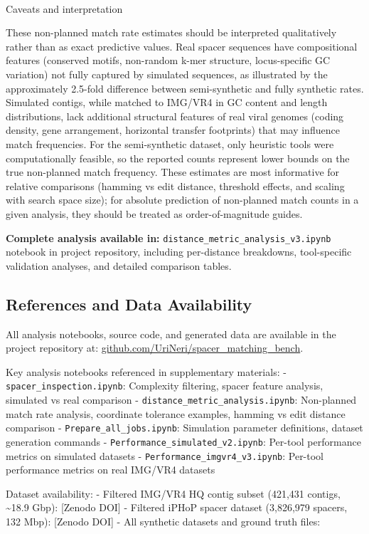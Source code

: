 \documentclass[
]{article}
\makeatletter
\let\oldparagraph\paragraph
\renewcommand{\paragraph}{
    \@ifstar
      \xxxParagraphStar
      \xxxParagraphNoStar
  }
\newcommand{\xxxParagraphStar}[1]{\oldparagraph*{#1}\mbox{}}
\newcommand{\xxxParagraphNoStar}[1]{\oldparagraph{#1}\mbox{}}
\makeatother
\begin{document}
\paragraph{Caveats and interpretation}\label{caveats-and-interpretation}

These non-planned match rate estimates should be interpreted
qualitatively rather than as exact predictive values. Real spacer
sequences have compositional features (conserved motifs, non-random
k-mer structure, locus-specific GC variation) not fully captured by
simulated sequences, as illustrated by the approximately 2.5-fold
difference between semi-synthetic and fully synthetic rates. Simulated
contigs, while matched to IMG/VR4 in GC content and length
distributions, lack additional structural features of real viral genomes
(coding density, gene arrangement, horizontal transfer footprints) that
may influence match frequencies. For the semi-synthetic dataset, only
heuristic tools were computationally feasible, so the reported counts
represent lower bounds on the true non-planned match frequency. These
estimates are most informative for relative comparisons (hamming vs edit
distance, threshold effects, and scaling with search space size); for
absolute prediction of non-planned match counts in a given analysis,
they should be treated as order-of-magnitude guides.

\textbf{Complete analysis available in:}
\texttt{distance\_metric\_analysis\_v3.ipynb} notebook in project
repository, including per-distance breakdowns, tool-specific validation
analyses, and detailed comparison tables.

\subsection{References and Data
Availability}\label{references-and-data-availability}

All analysis notebooks, source code, and generated data are available in
the project repository at:
\href{https://github.com/UriNeri/spacer_matching_bench}{github.com/UriNeri/spacer\_matching\_bench}.

Key analysis notebooks referenced in supplementary materials: -
\texttt{spacer\_inspection.ipynb}: Complexity filtering, spacer feature
analysis, simulated vs real comparison -
\texttt{distance\_metric\_analysis.ipynb}: Non-planned match rate
analysis, coordinate tolerance examples, hamming vs edit distance
comparison - \texttt{Prepare\_all\_jobs.ipynb}: Simulation parameter
definitions, dataset generation commands -
\texttt{Performance\_simulated\_v2.ipynb}: Per-tool performance metrics
on simulated datasets - \texttt{Performance\_imgvr4\_v3.ipynb}: Per-tool
performance metrics on real IMG/VR4 datasets

Dataset availability: - Filtered IMG/VR4 HQ contig subset (421,431
contigs, \textasciitilde18.9 Gbp): {[}Zenodo DOI{]} - Filtered iPHoP
spacer dataset (3,826,979 spacers, 132 Mbp): {[}Zenodo DOI{]} - All
synthetic datasets and ground truth files: \autocite{zenodo_doi}


\printbibliography
\end{document}
